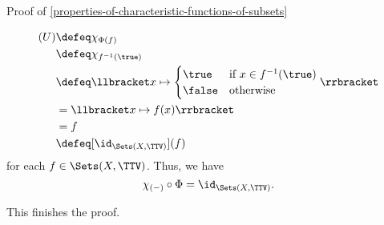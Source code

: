 \begin{Proof}{Proof of \cref{properties-of-characteristic-functions-of-subsets}}
\begin{enumerate}
            \begin{align*}
                [\chi_{(-)}\circ\Phi](U) &\defeq \chi_{\Phi(f)}\\
                                         &\defeq \chi_{f^{-1}(\true)}\\
                                         &\defeq \llbracket x\mapsto\begin{cases}\true &\text{if $x\in f^{-1}(\true)$}\\\false &\text{otherwise}\end{cases}\rrbracket\\
                                         &=      \llbracket x\mapsto f(x)\rrbracket\\
                                         &=      f\\
                                         &\defeq [\id_{\Sets(X,\TTV)}](f)
            \end{align*}
            for each $f\in\Sets(X,\TTV)$. Thus, we have
            \[
                \chi_{(-)}\circ\Phi%
                =%
                \id_{\Sets(X,\TTV)}.%
            \]%
    \end{enumerate}
    This finishes the proof.


\end{Proof}
